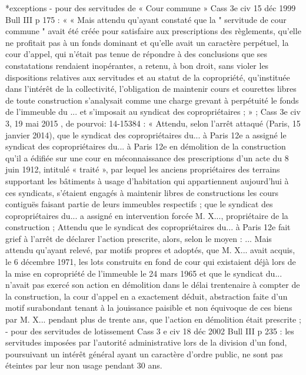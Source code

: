 \documentclass[11pt,a4paper]{report}
\begin{document}
	*exceptions
	- pour des servitudes de « Cour commune » Cass 3e civ 15 déc 1999 Bull III  p 175 : « « Mais attendu
	qu'ayant constaté que la " servitude de cour commune " avait été créée pour satisfaire aux prescriptions des
	règlements, qu'elle ne profitait pas à un fonds dominant et qu'elle avait un caractère perpétuel, la cour d'appel,
	qui n'était pas tenue de répondre à des conclusions que ses constatations rendaient inopérantes, a retenu, à bon
	droit, sans violer les dispositions relatives aux servitudes et au statut de la copropriété, qu'instituée dans l'intérêt
	de la collectivité, l'obligation de maintenir cours et courettes libres de toute construction s'analysait comme une
	charge grevant à perpétuité le fonds de l'immeuble du ... et s'imposait au syndicat des copropriétaires ; » ;
	Cass 3e civ 3, 19 mai 2015 , \No  de pourvoi: 14-15384 : « Attendu, selon l'arrêt attaqué (Paris, 15 janvier
	2014), que le syndicat des copropriétaires du... à Paris 12e a assigné le syndicat des copropriétaires du... à
	Paris 12e en démolition de la construction qu'il a édifiée sur une cour en méconnaissance des prescriptions d'un
	acte du 8 juin 1912, intitulé « traité », par lequel les anciens propriétaires des terrains supportant les bâtiments
	à usage d'habitation qui appartiennent aujourd'hui à ces syndicats, s'étaient engagés à maintenir libres de
	constructions les cours contiguës faisant partie de leurs immeubles respectifs ; que le syndicat des
	copropriétaires du... a assigné en intervention forcée M. X..., propriétaire de la construction ;
	Attendu que le syndicat des copropriétaires du... à Paris 12e fait grief à l'arrêt de déclarer l'action prescrite,
	alors, selon le moyen : ...
	Mais attendu qu'ayant relevé, par motifs propres et adoptés, que M. X... avait acquis, le 6 décembre 1971, les
	lots construits en fond de cour qui existaient déjà lors de la mise en copropriété de l'immeuble le 24 mars 1965
	et que le syndicat du... n'avait pas exercé son action en démolition dans le délai trentenaire à compter de la
	construction, la cour d'appel en a exactement déduit, abstraction faite d'un motif surabondant tenant à la
	jouissance paisible et non équivoque de ces biens par M. X... pendant plus de trente ans, que l'action en
	démolition était prescrite ;
	- pour des servitudes de lotissement Cass 3 e civ 18 déc 2002 Bull III  p 235 : les servitudes imposées par
	l’autorité administrative lors de la division d’un fond, poursuivant un intérêt général ayant un caractère d’ordre
	public, ne sont pas éteintes par leur non usage pendant 30 ans.
\end{document}
